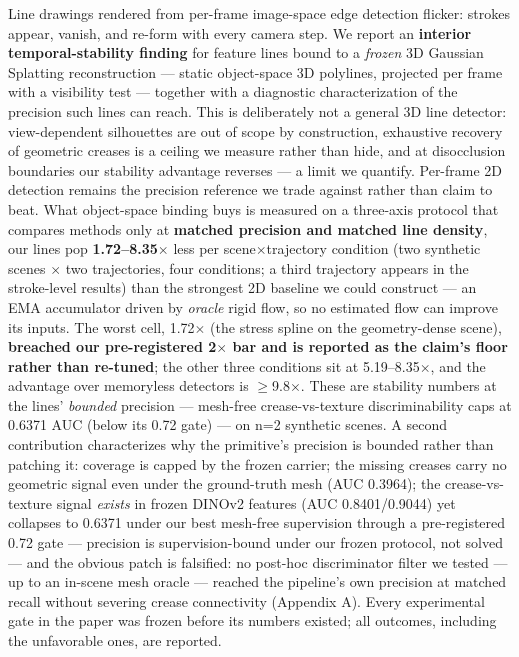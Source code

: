 Line drawings rendered from per-frame image-space edge detection flicker: strokes appear,
vanish, and re-form with every camera step. We report an \textbf{interior temporal-stability
finding} for feature lines bound to a \emph{frozen} 3D Gaussian Splatting reconstruction ---
static object-space 3D polylines, projected per frame with a visibility test --- together
with a diagnostic characterization of the precision such lines can reach. This is deliberately not a general 3D line detector: view-dependent silhouettes are out
of scope by construction, exhaustive recovery of geometric creases is a ceiling we measure
rather than hide, and at disocclusion boundaries our stability advantage reverses --- a
limit we quantify. Per-frame 2D detection remains the precision reference we trade
against rather than claim to beat. What object-space binding buys is measured on a
three-axis protocol that compares
methods only at \textbf{matched precision and matched line density}, our lines pop
\textbf{1.72--8.35$\times$} less per scene$\times$trajectory condition (two synthetic scenes $\times$ two
trajectories, four conditions; a third trajectory appears in the stroke-level results)
than the strongest 2D baseline we could construct --- an EMA accumulator
driven by \emph{oracle} rigid flow, so no estimated flow can improve its inputs. The worst
cell, 1.72$\times$ (the stress spline on the geometry-dense scene), \textbf{breached our pre-registered
2$\times$ bar and is reported as the claim's floor rather than re-tuned}; the other three
conditions sit at 5.19--8.35$\times$, and the advantage over memoryless detectors is $\geq$9.8$\times$. These
are stability numbers at the lines' \emph{bounded} precision --- mesh-free crease-vs-texture
discriminability caps at 0.6371 AUC (below its 0.72 gate) --- on n=2 synthetic scenes. A second contribution characterizes why the primitive's precision is bounded
rather than patching it: coverage is capped by the frozen carrier; the missing creases
carry no geometric signal even under the ground-truth mesh (AUC 0.3964); the
crease-vs-texture signal \emph{exists} in frozen DINOv2 features (AUC 0.8401/0.9044) yet
collapses to 0.6371 under our best mesh-free supervision through a pre-registered 0.72
gate --- precision is supervision-bound under our frozen protocol, not solved --- and the
obvious patch is falsified: no post-hoc discriminator filter we tested --- up to an
in-scene mesh oracle --- reached the pipeline's own precision at matched recall without
severing crease connectivity (Appendix A). Every
experimental gate in the paper was frozen before its numbers existed; all outcomes,
including the unfavorable ones, are reported.

